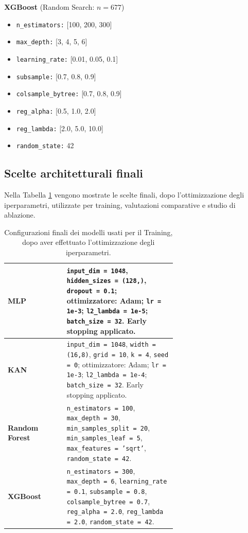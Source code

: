 \documentclass[a4paper,12pt]{report}
\begin{document}
	\smallskip
	\noindent\textbf{XGBoost} \quad (Random Search: $n=677$)
	\begin{itemize}
		\item \texttt{n\_estimators:} [100, 200, 300]
		\item \texttt{max\_depth:} [3, 4, 5, 6]
		\item \texttt{learning\_rate:} [0.01, 0.05, 0.1]
		\item \texttt{subsample:} [0.7, 0.8, 0.9]
		\item \texttt{colsample\_bytree:} [0.7, 0.8, 0.9]
		\item \texttt{reg\_alpha:} [0.5, 1.0, 2.0]
		\item \texttt{reg\_lambda:} [2.0, 5.0, 10.0]
		\item \texttt{random\_state:} 42
	\end{itemize}
	
	\subsection{Scelte architetturali finali}
	Nella Tabella \ref{tab:model-config-car} vengono mostrate le scelte finali, dopo l'ottimizzazione degli iperparametri, utilizzate per training, valutazioni comparative e studio di ablazione.
	
	\begin{table}[H]
		\centering
		\caption{Configurazioni finali dei modelli usati per il Training, dopo aver effettuato l'ottimizzazione degli iperparametri.}
		\label{tab:model-config-car}
		\begin{tabular}{l p{0.65\linewidth}}
			\toprule
			\textbf{MLP} & \texttt{input\_dim = 1048}, \texttt{hidden\_sizes = (128,)}, \texttt{dropout = 0.1}; ottimizzatore: Adam; \texttt{lr = 1e-3}; \texttt{l2\_lambda = 1e-5}; \texttt{batch\_size = 32}. Early stopping applicato. \\
			\midrule
			\textbf{KAN} & \texttt{input\_dim = 1048}, \texttt{width = (16,8)}, \texttt{grid = 10}, \texttt{k = 4}, \texttt{seed = 0}; ottimizzatore: Adam; \texttt{lr = 1e-3}; \texttt{l2\_lambda = 1e-4}; \texttt{batch\_size = 32}. Early stopping applicato. \\
			\midrule
			\textbf{Random Forest} & \texttt{n\_estimators = 100}, \texttt{max\_depth = 30}, \texttt{min\_samples\_split = 20}, \texttt{min\_samples\_leaf = 5}, \texttt{max\_features = 'sqrt'}, \texttt{random\_state = 42}. \\
			\midrule
			\textbf{XGBoost} & \texttt{n\_estimators = 300}, \texttt{max\_depth = 6}, \texttt{learning\_rate = 0.1}, \texttt{subsample = 0.8}, \texttt{colsample\_bytree = 0.7}, \texttt{reg\_alpha = 2.0}, \texttt{reg\_lambda = 2.0}, \texttt{random\_state = 42}. \\
			\bottomrule
		\end{tabular}
	\end{table}
	
\end{document}
